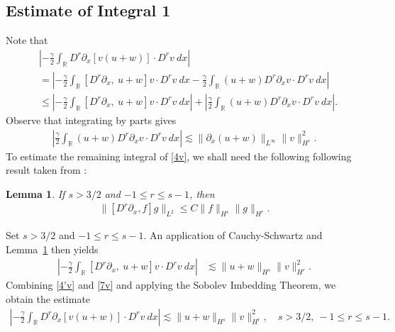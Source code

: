 \documentclass[12pt,reqno]{amsart}
\numberwithin{equation}{section}  %
\numberwithin{figure}{section}
\newcommand{\rr}{\mathbb{R}}
\newcommand{\p}{\partial}
\newtheorem{lemma}[theorem]{Lemma}
\begin{document}
\subsection{Estimate of Integral 1} Note that
%
%
\begin{equation}
\begin{split}
& \left |  -\frac{\gamma}{2} \int_{\rr} D^r \p_x [v(u+w)] \cdot
D^r v \ dx \right |
\\
& =
\left |
-\frac{\gamma}{2} \int_{\rr} \left[ D^r \p_x, \ u+w \right]v \cdot
D^r v \ dx - \frac{\gamma}{2} \int_{\rr} (u+w) D^r
\p_x v \cdot D^r v\ dx
\right | \\
& \le \left |
-\frac{\gamma}{2} \int_{\rr} \left[ D^r \p_x, \ u+w \right]v \cdot
D^r v \ dx \right |
+ \left | \frac{\gamma}{2} \int_{\rr} (u+w) D^r \p_x v
\cdot D^r v\
dx \right |.
\label{4v}
\end{split}
\end{equation}
%
%
Observe that integrating by parts gives
%
%
\begin{equation}
\begin{split}
\left | \frac{\gamma}{2}\int_{\rr} (u+w) D^r \p_x v \cdot
D^r v \ dx \right |
\lesssim \|\p_x (u+w)\|_{L^\infty}
\|v\|_{H^r}^2.
\label{4'v}
\end{split}
\end{equation}
%
%
%
%
To estimate the remaining integral of \eqref{4v}, we shall need the following
following result taken from \cite{Himonas_2009_Non-uniform-dep-per}:
%
\begin{lemma}
\label{cor1}
If $s > 3/2$ and $-1 \le r  \le s -1$, then
%
%
\begin{equation}
\begin{split}
\|[D^r \p_x ,f]g\|_{L^2} \le C \|f\|_{H^s} \|g\|_{H^r}.
\label{15}
\end{split}
\end{equation}
%
%
\end{lemma}
%
%
Set $s > 3/2$ and $-1 \le r \le s -1$. An application of 
Cauchy-Schwartz and Lemma~\ref{cor1} then yields 
%
%
\begin{equation}
\begin{split}
 \left | -\frac{\gamma}{2} \int_{\rr} [D^r \p_x, \ u+w] v
\cdot D^r v \ dx \right |
& \lesssim \|u+w\|_{H^s} 
\|v\|_{H^r}^2.
\label{7v}
\end{split}
\end{equation}
%
%
Combining \eqref{4'v} and \eqref{7v} and applying the Sobolev Imbedding 
Theorem, we obtain the estimate
%
%
\begin{equation}
\begin{split}
\left |  -\frac{\gamma}{2} \int_{\rr} D^r \p_x [v(u+w)] \cdot
D^r v \ dx \right |
 \lesssim \|u+w\|_{H^s} \|v\|_{H^r}^2, \quad s > 3/2, \ -1 \le r \le s-1.
\label{8v}
\end{split}
\end{equation}
%
%
\end{document}
